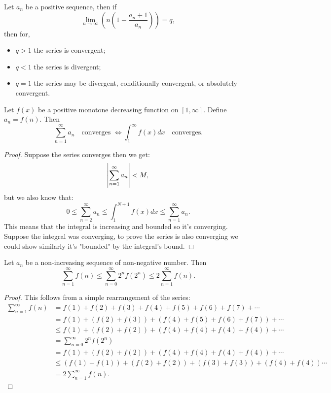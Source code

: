 \documentclass[11pt,a4paper]{article}
\begin{document}
  \begin{proposition}
    Let $a_n$ be a positive sequence, then if
    \[
      \lim_{n\to\infty} \left(n\left(1-\frac{a_n+1}{a_n}\right)\right) = q,
    \]
    then for,
    \begin{itemize}
      \item $q > 1$ the series is convergent;
      \item $q < 1$ the series is divergent;
      \item $q = 1$ the series may be divergent, conditionally convergent,
        or absolutely convergent.
    \end{itemize}
  \end{proposition}
	
	\newpage
	
  \begin{proposition}
    Let $f(x)$ be a positive monotone decreasing function on $[1,\infty]$. 
    Define $a_n = f(n)$. Then
    \[
      \sum_{n=1}^{\infty}{a_n} \quad \text{converges } \iff 
      \int_{1}^{\infty}{f(x)dx} \quad\text{converges}.
    \]
  \end{proposition}
  \begin{proof}
    Suppose the series converges then we get:
    \[
      \abs{\sum_{n=1}^{\infty} a_n} < M,
    \]
    but we also know that:
    \[
      0 \le
      \sum_{n=2}^{\infty} a_n \le 
      \int_{1}^{N+1} f(x)dx \le
      \sum_{n=1}^{\infty} a_n.
    \]
    This means that the integral is increasing and bounded so it's converging. 
    Suppose the integral was converging, to prove the series is also converging 
    we could show similarly it's "bounded" by the integral's bound.
  \end{proof}
	
	\newpage
	
  \begin{proposition}
    Let $a_n$ be a non-increasing sequence of non-negative number.
    Then
    \[
       \sum_{n=1}^\infty {f(n)} \le 
       \sum_{n=0}^\infty {2^n f(2^n)} \le
      2\sum_{n=1}^\infty {f(n)}.
    \]
  \end{proposition}
  \begin{proof}
    This follows from a simple rearrangement of the series:
    \begin{align*}
      \sum_{n=1}^\infty{f(n)} 
      & = f(1) +  f(2) + f(3)  +  f(4) + f(5) + f(6) + f(7)  +\cdots \\
      & = f(1) + (f(2) + f(3)) + (f(4) + f(5) + f(6) + f(7)) +\cdots \\
       &\le f(1) + (f(2) + f(2)) + (f(4) + f(4) + f(4) + f(4)) +\cdots  \\
      & =  \sum_{n=0}^\infty{2^nf(2^n)} \\
      & = f(1) + (f(2) + f(2)) + (f(4) + f(4) + f(4) + f(4)) +\cdots \\
      & \le  (f(1)+f(1))+(f(2)+f(2))+(f(3)+f(3))+(f(4)+f(4)) \cdots \\
      & = 2\sum_{n=1}^\infty {f(n)}.
    \end{align*}
  \end{proof}
	
\end{document}

